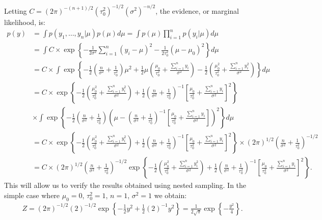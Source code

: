 \documentclass[11pt]{article}
\begin{document}
Letting $C=(2\pi)^{-(n+1)/2}(\tau_{0}^{2})^{-1/2}(\sigma^{2})^{-n/2}$, the evidence, or marginal likelihood, is:
\begin{align*}
 p(y) &= \int p(y_{1},\ldots,y_{n}|\mu)p(\mu)d\mu = \int p(\mu)\prod_{i=1}^{n}p(y_{i}|\mu) d\mu \\
 &= \int C \times \exp\left\{-\frac{1}{2\sigma^{2}}\sum_{i=1}^{n}(y_{i}-\mu)^{2} -\frac{1}{2\tau_{0}^{2}}(\mu-\mu_{0})^{2} \right\} d\mu \\
 &= C \times \int \exp\left\{-\frac{1}{2}\left(\frac{n}{\sigma^{2}}+\frac{1}{\tau_{0}^{2}}\right)\mu^{2} + \frac{1}{2}\mu\left(\frac{\mu_{0}}{\tau_{0}^{2}} + \frac{\sum_{i=1}^{n}y_{i}}{\sigma^{2}}\right) - \frac{1}{2}\left(\frac{\mu_{0}^{2}}{\tau_{0}^{2}} + \frac{\sum_{i=1}^{n}y_{i}^{2}}{\sigma^{2}}\right) \right\} d\mu \\
  &= C \times \exp\left\{ - \frac{1}{2}\left(\frac{\mu_{0}^{2}}{\tau_{0}^{2}} + \frac{\sum_{i=1}^{n}y_{i}^{2}}{\sigma^{2}}\right)
  + \frac{1}{2}\left(\frac{n}{\sigma^{2}}+\frac{1}{\tau_{0}^{2}}\right)^{-1}\left[\frac{\mu_{0}}{\tau_{0}^{2}} + \frac{\sum_{i=1}^{n}y_{i}}{\sigma^{2}}\right]^{2}\right\} \\
  & \times  \int \exp\left\{ -\frac{1}{2}\left(\frac{n}{\sigma^{2}}+\frac{1}{\tau_{0}^{2}}\right)\left(\mu - \left(\frac{n}{\sigma^{2}}+\frac{1}{\tau_{0}^{2}}\right)^{-1}\left[\frac{\mu_{0}}{\tau_{0}^{2}} + \frac{\sum_{i=1}^{n}y_{i}}{\sigma^{2}}\right]\right)^{2} \right\}  d\mu \\
 &=  C\times\exp\left\{ - \frac{1}{2}\left(\frac{\mu_{0}^{2}}{\tau_{0}^{2}} + \frac{\sum_{i=1}^{n}y_{i}^{2}}{\sigma^{2}}\right)
  + \frac{1}{2}\left(\frac{n}{\sigma^{2}}+\frac{1}{\tau_{0}^{2}}\right)^{-1}\left[\frac{\mu_{0}}{\tau_{0}^{2}} + \frac{\sum_{i=1}^{n}y_{i}}{\sigma^{2}}\right]^{2}\right\} \times{} (2\pi)^{1/2}\left(\frac{n}{\sigma^{2}}+\frac{1}{\tau_{0}^{2}}\right)^{-1/2} \\
   &= C\times(2\pi)^{1/2}\left(\frac{n}{\sigma^{2}}+\frac{1}{\tau_{0}^{2}}\right)^{-1/2}\exp\left\{ - \frac{1}{2}\left(\frac{\mu_{0}^{2}}{\tau_{0}^{2}} + \frac{\sum_{i=1}^{n}y_{i}^{2}}{\sigma^{2}}\right)
  + \frac{1}{2}\left(\frac{n}{\sigma^{2}}+\frac{1}{\tau_{0}^{2}}\right)^{-1}\left[\frac{\mu_{0}}{\tau_{0}^{2}} + \frac{\sum_{i=1}^{n}y_{i}}{\sigma^{2}}\right]^{2}\right\} .
\end{align*}
This will allow us to verify the results obtained using nested sampling. In the simple case where $\mu_{0}=0$, $\tau_{0}^{2}=1$, $n=1$, $\sigma^{2}=1$ we obtain:
\begin{align*}
Z = (2\pi)^{-1/2}\left(2\right)^{-1/2}\exp\left\{ - \frac{1}{2}y^{2} + \frac{1}{2}\left(2\right)^{-1}y^{2}\right\}  = \frac{1}{2\sqrt{\pi}}\exp\left\{-\frac{y^{2}}{4}\right\} .
\end{align*}
\end{document}
